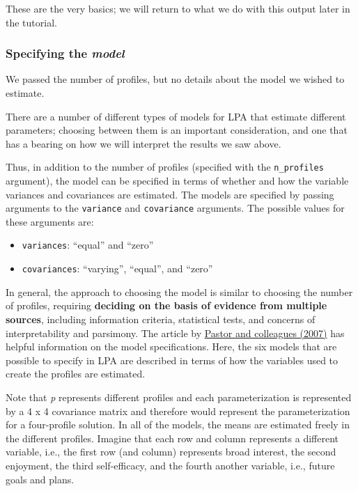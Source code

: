 \documentclass[man]{apa6}
\providecommand{\tightlist}{%
  \setlength{\itemsep}{0pt}\setlength{\parskip}{0pt}}
\begin{document}
These are the very basics; we will return to what we do with this output later in the tutorial.

\hypertarget{specifying-the-model}{%
\subsubsection{\texorpdfstring{Specifying the \emph{model}}{Specifying the model}}\label{specifying-the-model}}

We passed the number of profiles, but no details about the model we wished to estimate.

There are a number of different types of models for LPA that estimate different parameters; choosing
between them is an important consideration, and one that has a bearing on how we will interpret the results we saw above.

Thus, in addition to the number of profiles (specified with the \texttt{n\_profiles}
argument), the model can be specified in terms of whether and how the variable
variances and covariances are estimated. The models are specified by passing arguments to the \texttt{variance} and \texttt{covariance}
arguments. The possible values for these arguments are:

\begin{itemize}
\tightlist
\item
  \texttt{variances}: \enquote{equal} and \enquote{zero}
\item
  \texttt{covariances}: \enquote{varying}, \enquote{equal}, and \enquote{zero}
\end{itemize}

In general, the approach to choosing the model is similar to choosing the number of profiles, requiring \textbf{deciding on the basis of evidence from multiple sources}, including information criteria, statistical tests, and concerns of interpretability and parsimony. The article by \href{https://www.sciencedirect.com/science/article/pii/S0361476X06000543}{Pastor and colleagues (2007)} has helpful information on the model specifications. Here, the six models that are possible to specify in LPA are described in terms of how the variables used to create the profiles are estimated.

Note that \emph{p} represents different profiles and each parameterization is represented by a 4 x 4 covariance matrix and therefore would represent the parameterization for a four-profile solution. In all of the models, the means are estimated freely in the different profiles. Imagine that each row and column represents a different variable, i.e., the first row (and column) represents broad interest, the second enjoyment, the third self-efficacy, and the fourth another variable, i.e., future goals and plans.
\end{document}
